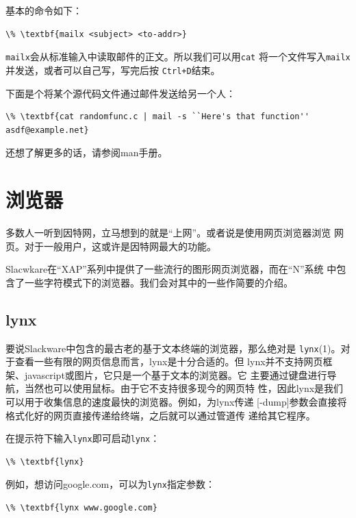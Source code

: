 基本的命令如下：
\begin{Verbatim}[frame=single, commandchars=\\\{\}]
\% \textbf{mailx <subject> <to-addr>}
\end{Verbatim}

\texttt{mailx}会从标准输入中读取邮件的正文。所以我们可以用\texttt{cat}
将一个文件写入\texttt{mailx}并发送，或者可以自己写，写完后按
\texttt{Ctrl+D}结束。

下面是个将某个源代码文件通过邮件发送给另一个人：
\begin{Verbatim}[frame=single, commandchars=\\\{\}]
\% \textbf{cat randomfunc.c | mail -s ``Here's that function'' asdf@example.net}
\end{Verbatim}

还想了解更多的话，请参阅man手册。

\section{浏览器}
\label{chap:basicNetworkCommands:browsers}
多数人一听到因特网，立马想到的就是``上网''。或者说是使用网页浏览器浏览
网页。对于一般用户，这或许是因特网最大的功能。

Slacwkare在``XAP''系列中提供了一些流行的图形网页浏览器，而在``N''系统
中包含了一些字符模式下的浏览器。我们会对其中的一些作简要的介绍。

\subsection{lynx}
\label{chap:basicNetworkCommands:browsers:lynx}
要说Slackware中包含的最古老的基于文本终端的浏览器，那么绝对是
\texttt{lynx}(1)。对于查看一些有限的网页信息而言，lynx是十分合适的。但
lynx并不支持网页框架、javascript或图片，它只是一个基于文本的浏览器。它
主要通过键盘进行导航，当然也可以使用鼠标。由于它不支持很多现今的网页特
性，因此lynx是我们可以用于收集信息的速度最快的浏览器。例如，为lynx传递
[-dump]参数会直接将格式化好的网页直接传递给终端，之后就可以通过管道传
递给其它程序。

在提示符下输入\texttt{lynx}即可启动\texttt{lynx}：
\begin{Verbatim}[frame=single, commandchars=\\\{\}]
\% \textbf{lynx}
\end{Verbatim}
例如，想访问google.com，可以为\texttt{lynx}指定参数：
\begin{Verbatim}[frame=single, commandchars=\\\{\}]
\% \textbf{lynx www.google.com}
\end{Verbatim}

